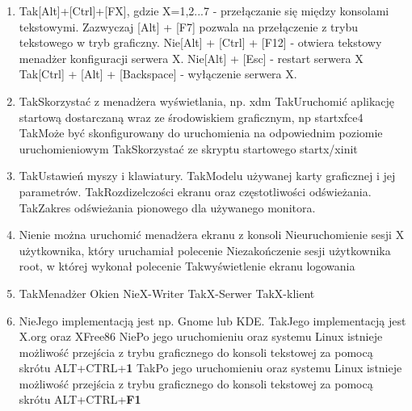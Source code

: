 \begin{enumerate}
	\item {}
	{Tak}{[Alt]+[Ctrl]+[FX], gdzie X={1,2...7} - przełączanie się między konsolami tekstowymi. Zazwyczaj [Alt] + [F7] pozwala na przełączenie z trybu tekstowego  w tryb graficzny.}
	{Nie}{[Alt] + [Ctrl] + [F12] - otwiera tekstowy menadżer konfiguracji serwera X.}
	{Nie}{[Alt] + [Esc] - restart serwera X}
	{Tak}{[Ctrl] + [Alt] + [Backspace] - wyłączenie serwera X.}
	
	\item {}
	{Tak}{Skorzystać z menadżera wyświetlania, np. xdm}
	{Tak}{Uruchomić aplikację startową dostarczaną wraz ze środowiskiem graficznym, np startxfce4}
	{Tak}{Może być skonfigurowany do uruchomienia na odpowiednim poziomie uruchomieniowym}
	{Tak}{Skorzystać ze skryptu startowego startx/xinit}

	\item {}
	{Tak}{Ustawień myszy i klawiatury.}
	{Tak}{Modelu używanej karty graficznej i jej parametrów.}
	{Tak}{Rozdizelczości ekranu oraz częstotliwości odświeżania.}
	{Tak}{Zakres odświeżania pionowego dla używanego monitora.}
	
	\item {}
	{Nie}{nie można uruchomić menadżera ekranu z konsoli}
	{Nie}{uruchomienie sesji X użytkownika, który uruchamiał polecenie}
	{Nie}{zakończenie sesji użytkownika root, w której wykonał polecenie}
	{Tak}{wyświetlenie ekranu logowania}
	
	\item {}
	{Tak}{Menadżer Okien}
	{Nie}{X-Writer}
	{Tak}{X-Serwer}
	{Tak}{X-klient}
	
	\item {}
	{Nie}{Jego implementacją jest np. Gnome lub KDE.}
	{Tak}{Jego implementacją jest X.org oraz XFree86}
	{Nie}{Po jego uruchomieniu oraz systemu Linux istnieje możliwość przejścia z trybu graficznego do konsoli tekstowej za pomocą skrótu ALT+CTRL+\textbf{1}}
	{Tak}{Po jego uruchomieniu oraz systemu Linux istnieje możliwość przejścia z trybu graficznego do konsoli tekstowej za pomocą skrótu ALT+CTRL+\textbf{F1}}
	

\end{enumerate}
